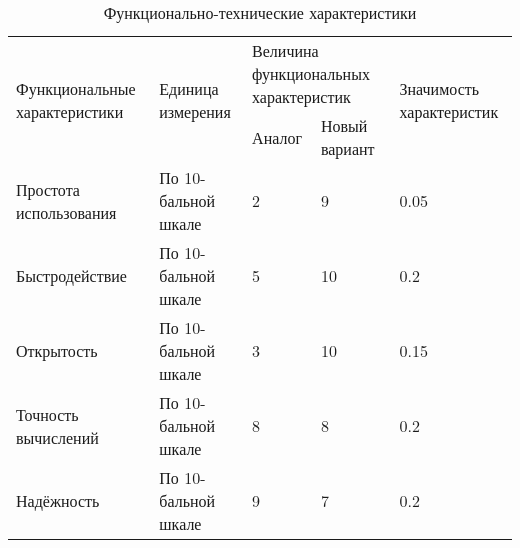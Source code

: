 \begin{table}
\caption{Функционально-технические характеристики}
\nohyphenation
\label{tab:econom:characteristics}
\begin{tabular}{|m{4cm}|m{3.2cm}|m{2.2cm}|m{2.2cm}|m{3.6cm}|}
\hline \multirow{2}{\hsize}{Функциональные характеристики} & \multirow{2}{\hsize}{Единица измерения} & \multicolumn{2}{m{4.8cm}|}{Величина функциональных характеристик} & \multirow{2}{\hsize}{Значимость характеристик} \\
\cline{3-4} & & Аналог & Новый вариант &  \\ 
\hline Простота использования & По 10-бальной шкале & 2 & 9 & 0.05 \\ 
\hline Быстродействие & По 10-бальной шкале & 5 & 10 & 0.2 \\ 
\hline Открытость & По 10-бальной шкале & 3 & 10 & 0.15 \\ 
\hline Точность вычислений & По 10-бальной шкале & 8 & 8 & 0.2 \\ 
\hline Надёжность & По 10-бальной шкале & 9 & 7 & 0.2 \\ 
\hline 
\end{tabular}
\end{table}